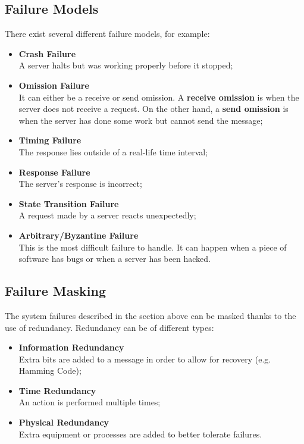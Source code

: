 \documentclass{article}
\begin{document}
\subsection{Failure Models}
There exist several different failure models, for example:
\begin{itemize}
	\item \textbf{Crash Failure} \\
	A server halts but was working properly before it stopped;
	\item \textbf{Omission Failure} \\
	It can either be a receive or send omission. A \textbf{receive omission} is when the server does not receive a request. On the other hand, a \textbf{send omission} is when the server has done some work but cannot send the message;
	\item \textbf{Timing Failure} \\
	The response lies outside of a real-life time interval;
	\item \textbf{Response Failure} \\
	The server's response is incorrect;
	\item \textbf{State Transition Failure} \\
	A request made by a server reacts unexpectedly;
	\item \textbf{Arbitrary/Byzantine Failure} \\
	This is the most difficult failure to handle. It can happen when a piece of software has bugs or when a server has been hacked.
\end{itemize}

\subsection{Failure Masking}
The system failures described in the section above can be masked thanks to the use of redundancy. Redundancy can be of different types:
\begin{itemize}
	\item \textbf{Information Redundancy} \\
	Extra bits are added to a message in order to allow for recovery (e.g. Hamming Code);
	\item \textbf{Time Redundancy} \\
	An action is performed multiple times;
	\item \textbf{Physical Redundancy} \\
	Extra equipment or processes are added to better tolerate failures.
\end{itemize}
\end{document}
